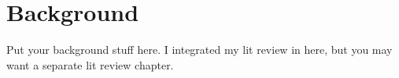 \chapter{Background}\label{chap:background}
Put your background stuff here. I integrated my lit review in here, but you may want a separate lit review chapter.
